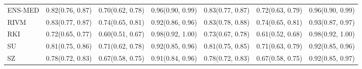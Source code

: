 \begin{tabular}{l p{} p{} p{} p{} p{} p{}}
ENS-MED & {0.82\newline(0.76, 0.87)} & {0.70\newline(0.62, 0.78)} & {0.96\newline(0.90, 0.99)} & {0.83\newline(0.77, 0.87)} & {0.72\newline(0.63, 0.79)} & {0.96\newline(0.90, 0.99)} \\
RIVM & {0.83\newline(0.77, 0.87)} & {0.74\newline(0.65, 0.81)} & {0.92\newline(0.86, 0.96)} & {0.83\newline(0.78, 0.88)} & {0.74\newline(0.65, 0.81)} & {0.93\newline(0.87, 0.97)} \\
RKI & {0.72\newline(0.65, 0.77)} & {0.60\newline(0.51, 0.67)} & {0.98\newline(0.92, 1.00)} & {0.73\newline(0.67, 0.78)} & {0.61\newline(0.52, 0.68)} & {0.98\newline(0.92, 1.00)} \\
SU & {0.81\newline(0.75, 0.86)} & {0.71\newline(0.62, 0.78)} & {0.92\newline(0.85, 0.96)} & {0.81\newline(0.75, 0.85)} & {0.71\newline(0.63, 0.79)} & {0.92\newline(0.85, 0.96)} \\
SZ & {0.78\newline(0.72, 0.83)} & {0.67\newline(0.58, 0.75)} & {0.91\newline(0.84, 0.96)} & {0.78\newline(0.72, 0.83)} & {0.67\newline(0.58, 0.75)} & {0.92\newline(0.85, 0.97)} \\
\bottomrule
\end{tabular}
